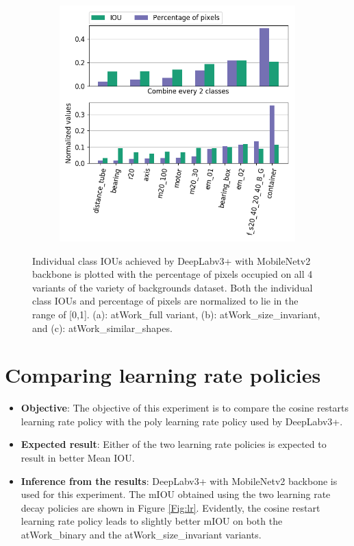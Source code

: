 \begin{figure}
\begin{subfigure}{.47\textwidth}
				\includegraphics[width=1\linewidth]{images/cls_iou_shape}
				\caption{}
				\label{Fig:clsiouc}
			\end{subfigure}
			\caption{Individual class IOUs achieved by DeepLabv3+ with MobileNetv2 backbone is plotted with the percentage of pixels occupied on all 4 variants of the variety of backgrounds dataset. Both the individual class IOUs and percentage of pixels are normalized to lie in the range of [0,1]. (a): atWork\_full variant, (b): atWork\_size\_invariant, and (c): atWork\_similar\_shapes.}
			\label{Fig:clsiou}
		\end{figure}

\section{Comparing learning rate policies}
\label{section:lr}
	
	\begin{itemize}
		\item \textbf{Objective}: The objective of this experiment is to compare the cosine restarts \cite{DBLP:journals/corr/LoshchilovH16a} learning rate policy with the poly learning rate policy used by DeepLabv3+.
		\item \textbf{Expected result}: Either of the two learning rate policies is expected to result in better Mean IOU.
		\item \textbf{Inference from the results}: DeepLabv3+ with MobileNetv2 backbone is used for this experiment. The mIOU obtained using the two learning rate decay policies are shown in Figure \ref{Fig:lr}. Evidently, the cosine restart learning rate policy leads to slightly better mIOU on both the atWork\_binary and the atWork\_size\_invariant variants.
	\end{itemize}
	
